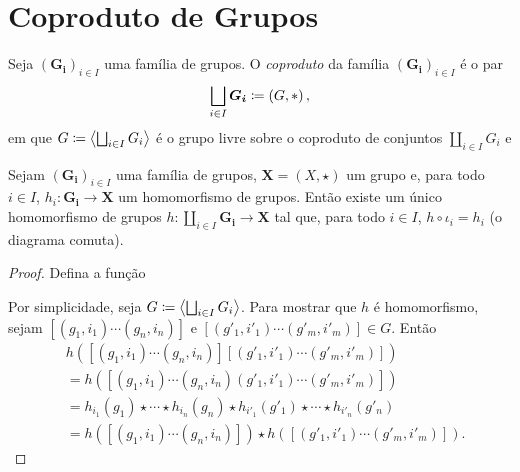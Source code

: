 \cleardoublepage
\section{Coproduto de Grupos}

\begin{defi}
Seja $(\bm{G_i})_{i \in I}$ uma família de grupos. O \emph{coproduto} da família $(\bm{G_i})_{i \in I}$ é o par
	\begin{equation*}
	\coprod_{i \in I} \bm{G_i} \coloneqq \left(G,\opb \right),
	\end{equation*}
em que $G \coloneqq \ger{\coprod_{i \in I} G_i}$ é o grupo livre sobre o coproduto de conjuntos $\coprod_{i \in I} G_i$ e 
\end{defi}

\begin{prop}
Sejam $(\bm{G_i})_{i \in I}$ uma família de grupos, $\bm X = (X,\star)$ um grupo e, para todo $i \in I$, $h_i: \bm{G_i} \to \bm X$ um homomorfismo de grupos. Então existe um único homomorfismo de grupos $h: \coprod_{i \in I} \bm{G_i} \to \bm X$ tal que, para todo $i \in I$, $h \circ \iota_i = h_i$ (o diagrama comuta).
\begin{figure}[!h]
\centering
{}
\end{figure}
\end{prop}
\begin{proof}
Defina a função 

Por simplicidade, seja $G \coloneqq \ger{\coprod_{i \in I} G_i}$. Para mostrar que $h$ é homomorfismo, sejam $[(g_1,i_1) \cdots (g_n,i_n)]$ e $[(g'_1,i'_1) \cdots (g'_m,i'_m)] \in G$. Então
	\begin{align*}
	&h([(g_1,i_1) \cdots (g_n,i_n)][(g'_1,i'_1) \cdots (g'_m,i'_m)]) \\
		&= h([(g_1,i_1) \cdots (g_n,i_n)(g'_1,i'_1) \cdots (g'_m,i'_m)]) \\
		&= h_{i_1}(g_1) \star \cdots \star h_{i_n}(g_n) \star h_{i'_1}(g'_1) \star \cdots \star h_{i'_n}(g'_n) \\
		&= h([(g_1,i_1) \cdots (g_n,i_n)]) \star h([(g'_1,i'_1) \cdots (g'_m,i'_m)]).
	\end{align*}
\end{proof}
